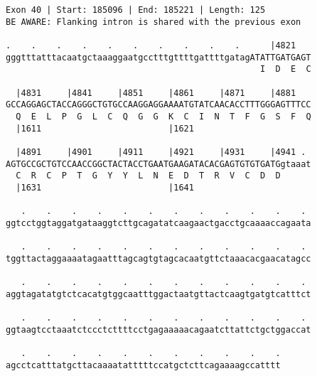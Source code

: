 \documentclass{article}
\begin{document}
\begin{Verbatim}
Exon 40 | Start: 185096 | End: 185221 | Length: 125
BE AWARE: Flanking intron is shared with the previous exon
 
.    .    .    .    .    .    .    .    .    .      |4821   
gggtttatttacaatgctaaaggaatgcctttgttttgattttgatagATATTGATGAGT
                                                  I  D  E  C
  
  |4831     |4841     |4851     |4861     |4871     |4881   
GCCAGGAGCTACCAGGGCTGTGCCAAGGAGGAAAATGTATCAACACCTTTGGGAGTTTCC
  Q  E  L  P  G  L  C  Q  G  G  K  C  I  N  T  F  G  S  F  Q
  |1611                         |1621                       
  
  |4891     |4901     |4911     |4921     |4931     |4941 . 
AGTGCCGCTGTCCAACCGGCTACTACCTGAATGAAGATACACGAGTGTGTGATGgtaaat
  C  R  C  P  T  G  Y  Y  L  N  E  D  T  R  V  C  D  D      
  |1631                         |1641                       
  
   .    .    .    .    .    .    .    .    .    .    .    . 
ggtcctggtaggatgataaggtcttgcagatatcaagaactgacctgcaaaaccagaata
  
   .    .    .    .    .    .    .    .    .    .    .    . 
tggttactaggaaaatagaatttagcagtgtagcacaatgttctaaacacgaacatagcc
  
   .    .    .    .    .    .    .    .    .    .    .    . 
aggtagatatgtctcacatgtggcaatttggactaatgttactcaagtgatgtcatttct
  
   .    .    .    .    .    .    .    .    .    .    .    . 
ggtaagtcctaaatctccctcttttcctgagaaaaacagaatcttattctgctggaccat
  
   .    .    .    .    .    .    .    .    .    .    .
agcctcatttatgcttacaaaatatttttccatgctcttcagaaaagccatttt
\end{Verbatim}
\newpage
\end{document}

